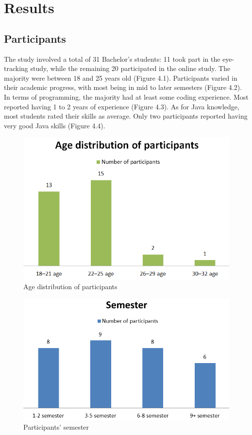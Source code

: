 \chapter{Results}

\section{Participants}

The study involved a total of 31 Bachelor’s students: 11 took part in the eye-tracking study, while the remaining 20 participated in the online study. The majority were between 18 and 25 years old (Figure 4.1).
Participants varied in their academic progress, with most being in mid to later semesters (Figure 4.2).
In terms of programming, the majority had at least some coding experience. Most reported having 1 to 2 years of experience (Figure 4.3).
As for Java knowledge, most students rated their skills as average. Only two participants reported having very good Java skills (Figure 4.4).


\begin{figure} [H]
  \centering
  \includegraphics[scale=0.9]{figures/age.png}
  \caption{Age distribution of participants}
  \label{fig:AnhangsChor}
\end{figure}


\begin{figure} [H]
  \centering
  \includegraphics[scale=1.1]{figures/semester.png}
  \caption{Participants' semester}
  \label{fig:AnhangsChor}
\end{figure}

